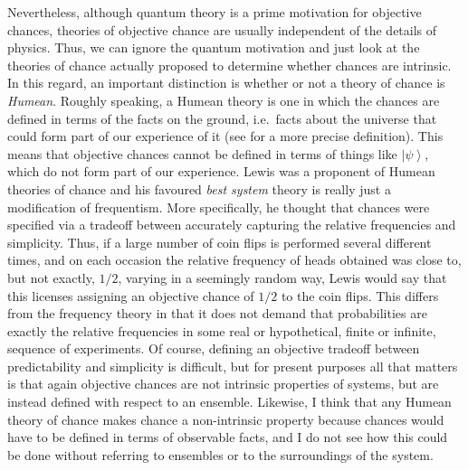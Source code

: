\documentclass[DIV=calc,fontsize=12pt]{scrartcl} %
\theoremstyle{definition}
\theoremstyle{plain}
\newcommand{\Ket}[1]{\ensuremath{\left \vert #1 \right \rangle}}
\begin{document}
Nevertheless, although quantum theory is a prime motivation for
objective chances, theories of objective chance are usually
independent of the details of physics.  Thus, we can ignore the
quantum motivation and just look at the theories of chance actually
proposed to determine whether chances are intrinsic.  In this regard,
an important distinction is whether or not a theory of chance is
\emph{Humean}.  Roughly speaking, a Humean theory is one in which the
chances are defined in terms of the facts on the ground, i.e.\ facts
about the universe that could form part of our experience of it (see
\cite{Eagle2011} for a more precise definition).  This means that
objective chances cannot be defined in terms of things like
$\Ket{\psi}$, which do not form part of our experience.  Lewis
\cite{Lewis2011} was a proponent of Humean theories of chance and his
favoured \emph{best system} theory is really just a modification of
frequentism.  More specifically, he thought that chances were
specified via a tradeoff between accurately capturing the relative
frequencies and simplicity.  Thus, if a large number of coin flips is
performed several different times, and on each occasion the relative
frequency of heads obtained was close to, but not exactly, $1/2$,
varying in a seemingly random way, Lewis would say that this licenses
assigning an objective chance of $1/2$ to the coin flips.  This
differs from the frequency theory in that it does not demand that
probabilities are exactly the relative frequencies in some real or
hypothetical, finite or infinite, sequence of experiments.  Of course,
defining an objective tradeoff between predictability and simplicity
is difficult, but for present purposes all that matters is that again
objective chances are not intrinsic properties of systems, but are
instead defined with respect to an ensemble.  Likewise, I think that
any Humean theory of chance makes chance a non-intrinsic property
because chances would have to be defined in terms of observable facts,
and I do not see how this could be done without referring to ensembles
or to the surroundings of the system.
\end{document}

